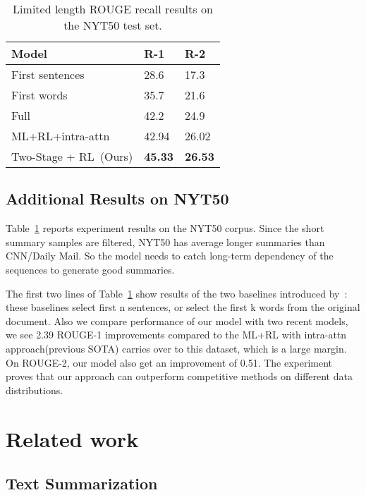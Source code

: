 \documentclass{article}
\begin{document}
\begin{table}[htpb]  
\centering
\begin{tabular}{l|ll}
\hline
Model                 & R-1                         & R-2       \\ \hline
First sentences	      & 28.6         		        &  17.3           \\
First  words  & 35.7         		        &  21.6              \\ \hline
Full~\cite{Durrett2016}      & 42.2                        &  24.9      \\ \hline
ML+RL+intra-attn~\cite{Paulus2018} & 42.94                 &  26.02  \\ \hline
Two-Stage + RL~(Ours)                       & \textbf{45.33} & \textbf{26.53}      \\ \hline
\end{tabular}
\caption{Limited length ROUGE recall results on the NYT50 test set.\label{r2}}
\end{table}

\subsection{Additional Results on NYT50}

Table~\ref{r2} reports experiment results on the NYT50 corpus. Since the short summary samples are filtered, NYT50 has average longer summaries than CNN/Daily Mail. So the model needs to catch long-term dependency of the sequences to generate good summaries.

The first two lines of Table~\ref{r2} show results of the two baselines introduced by~\cite{Durrett2016}: these baselines select first n sentences, or select the first k words from the original document. Also we compare performance of our model with two recent models, we see 2.39 ROUGE-1 improvements compared to the ML+RL with intra-attn approach(previous SOTA) carries over to this dataset, which is a large margin. On ROUGE-2, our model also get an improvement of 0.51. The experiment proves that our approach can outperform competitive methods on different data distributions.

\section{Related work}

\subsection{Text Summarization}
\end{document}
